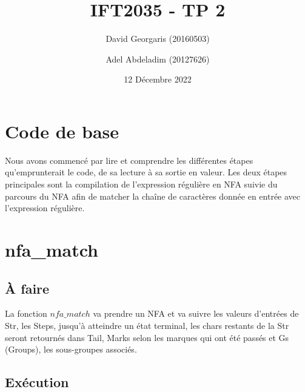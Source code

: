 \documentclass{article}
\title{IFT2035 - TP 2}
\author{David Georgaris (20160503) \and Adel Abdeladim (20127626) }
\date{12 Décembre 2022}
\begin{document}
\maketitle
\section{Code de base}
    Nous avons commencé par lire et comprendre les différentes étapes 
    qu'emprunterait le code, de sa lecture à sa sortie en valeur. Les 
    deux étapes principales sont la compilation de l'expression régulière
    en NFA suivie du parcours du NFA afin de matcher la chaîne de caractères 
    donnée en entrée avec l'expression régulière. \\


\section{nfa\_match}
    \subsection{À faire}
        La fonction $nfa\_match$ va prendre un NFA et va suivre les valeurs d'entrées de Str, 
        les Steps, jusqu'à atteindre un état terminal, les chars restants de la Str seront retournés 
        dans Tail, Marks selon les marques qui ont été passés et Gs (Groups), les sous-groupes associés.  

    \subsection{Exécution}
        
\end{document}
